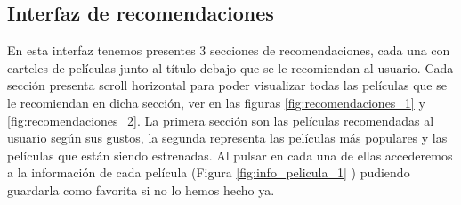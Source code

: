 \subsection{Interfaz de recomendaciones}
\label{makereference3.4.6}
En esta interfaz tenemos presentes 3 secciones de recomendaciones, cada una con carteles de películas junto al título debajo que se le recomiendan al usuario. Cada sección presenta scroll horizontal para poder
visualizar todas las películas que se le recomiendan en dicha sección, ver en las figuras \ref{fig:recomendaciones_1} y \ref{fig:recomendaciones_2}. La primera sección son las películas recomendadas al usuario según sus gustos, la segunda representa las películas más populares
y las películas que están siendo estrenadas. Al pulsar en cada una de ellas accederemos a la información de cada película (Figura \ref{fig:info_pelicula_1} ) pudiendo guardarla como favorita si no lo hemos hecho ya.
